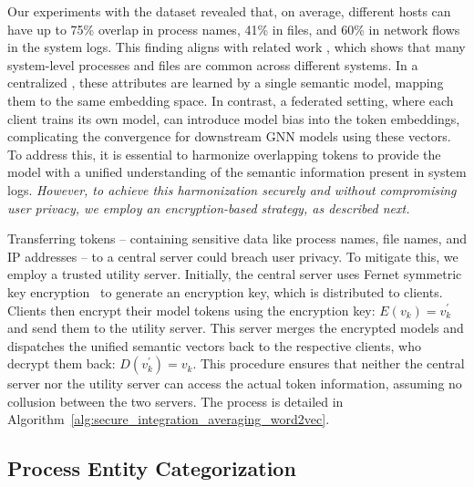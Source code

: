 

Our experiments with the \optc dataset revealed that, on average, different hosts can have up to 75\% overlap in process names, 41\% in files, and 60\% in network flows in the system logs. This finding aligns with related work \cite{flash2024}, which shows that many system-level processes and files are common across different systems. In a centralized \pids, these attributes are learned by a single semantic model, mapping them to the same embedding space. In contrast, a federated setting, where each client trains its own model, can introduce model bias into the token embeddings, complicating the convergence for downstream GNN models using these vectors. To address this, it is essential to harmonize overlapping tokens to provide the model with a unified understanding of the semantic information present in system logs.
\emph{However, to achieve this harmonization securely and without compromising user privacy, we employ an encryption-based strategy, as described next.}

Transferring tokens -- containing sensitive data like process names, file names, and IP addresses -- to a central server could breach user privacy. To mitigate this, we employ a trusted utility server. Initially, the central server uses Fernet symmetric key encryption~\cite{ismail2020fernet,bokhari2016review} to generate an encryption key, which is distributed to clients. Clients then encrypt their \wordvec model tokens using the encryption key: \(E(v_{k}) = v_{k}^{'}\) and send them to the utility server. This server merges the encrypted models and dispatches the unified semantic vectors back to the respective clients, who decrypt them back: \(D(v_{k}^{'}) = v_{k}.\) This procedure ensures that neither the central server nor the utility server can access the actual token information, assuming no collusion between the two servers. The process is detailed in Algorithm~\ref{alg:secure_integration_averaging_word2vec}.



\subsection{Process Entity Categorization}
\label{sys:catg}

